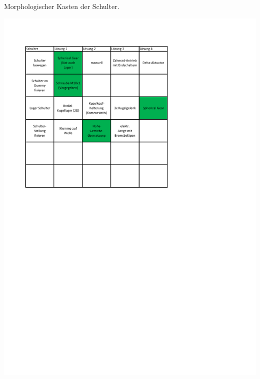 	\begin{table}[h]
		\caption[Morphologischer Kasten der Schulter]{Morphologischer Kasten der Schulter.}
		\centering
		\includegraphics[width=\textwidth]{Abb/Morphologischer_Kasten_Schulter}
		\label{fig:morphologische-kasten-schulter}
	\end{table}

